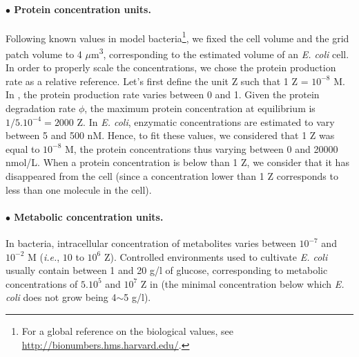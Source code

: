 \paragraph{$\bullet$ Protein concentration units.}
Following known values in model bacteria\footnote{For a global reference on the biological values, see \href{http://bionumbers.hms.harvard.edu/}{http://bionumbers.hms.harvard.edu/}.}, we fixed the cell volume and the grid patch volume to 4 $\mu$m\textsuperscript{3}, corresponding to the estimated volume of an \textit{E. coli} cell. In order to properly scale the concentrations, we chose the protein production rate as a relative reference. Let's first define the unit Z such that 1 Z = $10^{-8}$ M. In {\EvoEvoSim}, the protein production rate varies between 0 and 1. Given the protein degradation rate $\phi$, the maximum protein concentration at equilibrium is $1/5.10^{-4} = 2000$ Z. In \textit{E. coli}, enzymatic concentrations are estimated to vary between 5 and 500 nM. Hence, to fit these values, we considered that 1 Z was equal to $10^{-8}$ M, the protein concentrations thus varying between 0 and 20000 nmol/L. When a protein concentration is below than 1 Z, we consider that it has disappeared from the cell (since a concentration lower than 1 Z corresponds to less than one molecule in the cell).

\paragraph{$\bullet$ Metabolic concentration units.} 
In bacteria, intracellular concentration of metabolites varies between $10^{-7}$ and $10^{-2}$ M (\textit{i.e.}, $10$ to $10^{6}$ Z). Controlled environments used to cultivate \textit{E. coli} usually contain between 1 and 20 g/l of glucose, corresponding to metabolic concentrations of $5.10^{5}$ and $10^7$ Z in {\EvoEvoSim} (the minimal concentration below which \textit{E. coli} does not grow being 4$\sim$5 g/l).

